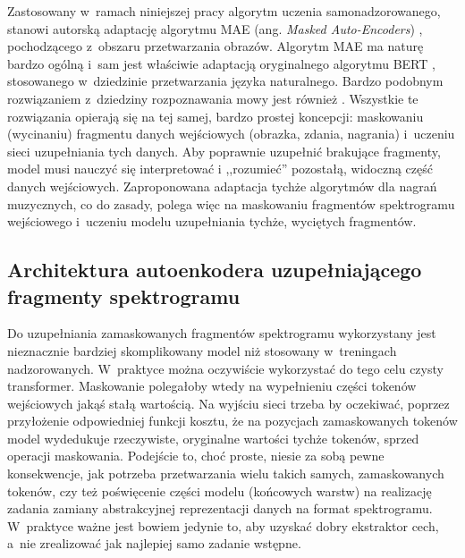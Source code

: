 Zastosowany w~ramach niniejszej pracy algorytm uczenia samonadzorowanego, stanowi autorską adaptację algorytmu MAE (ang. \emph{Masked Auto-Encoders}) \cite{he_masked_2021}, pochodzącego z~obszaru przetwarzania obrazów. Algorytm MAE ma naturę bardzo ogólną i~sam jest właściwie adaptacją oryginalnego algorytmu BERT \cite{devlin_bert_2019}, stosowanego w~dziedzinie przetwarzania języka naturalnego. Bardzo podobnym rozwiązaniem z~dziedziny rozpoznawania mowy jest również \cite{baevski_wav2vec_2020}. Wszystkie te rozwiązania opierają się na tej samej, bardzo prostej koncepcji: maskowaniu (wycinaniu) fragmentu danych wejściowych (obrazka, zdania, nagrania) i~uczeniu sieci uzupełniania tych danych. Aby poprawnie uzupełnić brakujące fragmenty, model musi nauczyć się interpretować i ,,rozumieć'' pozostałą, widoczną część danych wejściowych. Zaproponowana adaptacja tychże algorytmów dla nagrań muzycznych, co do zasady, polega więc na maskowaniu fragmentów spektrogramu wejściowego i~uczeniu modelu uzupełniania tychże, wyciętych fragmentów.

\subsection{Architektura autoenkodera uzupełniającego fragmenty spektrogramu}

Do uzupełniania zamaskowanych fragmentów spektrogramu wykorzystany jest nieznacznie bardziej skomplikowany model niż stosowany w~treningach nadzorowanych. W~praktyce można oczywiście wykorzystać do tego celu czysty transformer. Maskowanie polegałoby wtedy na wypełnieniu części tokenów wejściowych jakąś stałą wartością. Na wyjściu sieci trzeba by oczekiwać, poprzez przyłożenie odpowiedniej funkcji kosztu, że na pozycjach zamaskowanych tokenów model wydedukuje rzeczywiste, oryginalne wartości tychże tokenów, sprzed operacji maskowania. Podejście to, choć proste, niesie za sobą pewne konsekwencje, jak potrzeba przetwarzania wielu takich samych, zamaskowanych tokenów, czy też poświęcenie części modelu (końcowych warstw) na realizację zadania zamiany abstrakcyjnej reprezentacji danych na format spektrogramu. W~praktyce ważne jest bowiem jedynie to, aby uzyskać dobry ekstraktor cech, a~nie zrealizować jak najlepiej samo zadanie wstępne.

